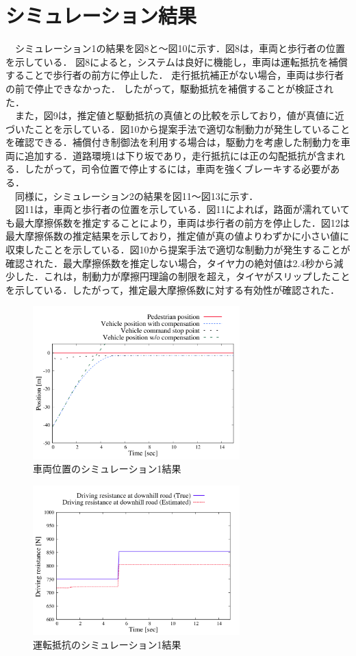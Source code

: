 \section{シミュレーション結果}
　シミュレーション1の結果を図8と〜図10に示す．図8は，車両と歩行者の位置を示している． 図8によると，システムは良好に機能し，車両は運転抵抗を補償することで歩行者の前方に停止した． 走行抵抗補正がない場合，車両は歩行者の前で停止できなかった． したがって，駆動抵抗を補償することが検証された．\\
　また，図9は，推定値と駆動抵抗の真値との比較を示しており，値が真値に近づいたことを示している．図10から提案手法で適切な制動力が発生していることを確認できる．補償付き制御法を利用する場合は，駆動力を考慮した制動力を車両に追加する．道路環境1は下り坂であり，走行抵抗には正の勾配抵抗が含まれる．したがって，司令位置で停止するには，車両を強くブレーキする必要がある．\\
　同様に，シミュレーション2の結果を図11〜図13に示す．\\
　図11は，車両と歩行者の位置を示している．図11によれば，路面が濡れていても最大摩擦係数を推定することにより，車両は歩行者の前方を停止した．図12は最大摩擦係数の推定結果を示しており，推定値が真の値よりわずかに小さい値に収束したことを示している．図10から提案手法で適切な制動力が発生することが確認された．最大摩擦係数を推定しない場合，タイヤ力の絶対値は2.4秒から減少した．これは，制動力が摩擦円理論の制限を超え，タイヤがスリップしたことを示している．したがって，推定最大摩擦係数に対する有効性が確認された．
\newpage

\begin{figure}[H]
    \centering
    \includegraphics[width=8cm]{./fig/fig8.png}
    \caption{車両位置のシミュレーション1結果}
\end{figure}

\begin{figure}[H]
    \centering
    \includegraphics[width=8cm]{./fig/fig9.png}
    \caption{運転抵抗のシミュレーション1結果}
\end{figure}

